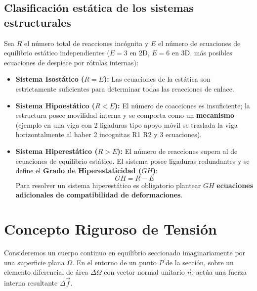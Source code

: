 \subsection{Clasificación estática de los sistemas estructurales}
Sea $R$ el número total de reacciones incógnita y $E$ el número de ecuaciones de equilibrio estático independientes ($E=3$ en 2D, $E=6$ en 3D, más posibles ecuaciones de despiece por rótulas internas):
\begin{itemize}
    \item \textbf{Sistema Isostático ($R = E$):} Las ecuaciones de la estática son estrictamente suficientes para determinar todas las reacciones de enlace.
    \item \textbf{Sistema Hipoestático ($R < E$):} El número de coacciones es insuficiente; la estructura posee movilidad interna y se comporta como un \textbf{mecanismo} (ejemplo en una viga con 2 ligaduras tipo apoyo móvil se traslada la viga horizontalmente al haber 2 incognitas R1 R2 y 3 ecuaciones).
    \item \textbf{Sistema Hiperestático ($R > E$):} El número de reacciones supera al de ecuaciones de equilibrio estático. El sistema posee ligaduras redundantes y se define el \textbf{Grado de Hiperestaticidad ($GH$)}:
          \begin{equation}
              GH = R - E
              \label{eq:grado_hiperestaticidad}
          \end{equation}
          Para resolver un sistema hiperestático es obligatorio plantear $GH$ \textbf{ecuaciones adicionales de compatibilidad de deformaciones}.
\end{itemize}
\section{Concepto Riguroso de Tensión}


Consideremos un cuerpo continuo en equilibrio seccionado imaginariamente por una superficie plana $\Omega$. En el entorno de un punto $P$ de la sección, sobre un elemento diferencial de área $\Delta \Omega$ con vector normal unitario $\vec{n}$, actúa una fuerza interna resultante $\Delta \vec{f}$.

